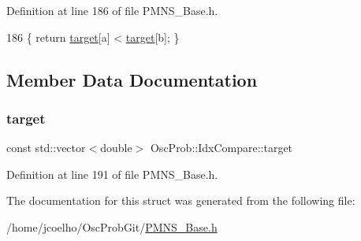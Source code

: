 Definition at line 186 of file P\+M\+N\+S\+\_\+\+Base.\+h.


\begin{DoxyCode}
186 \{ \textcolor{keywordflow}{return} \hyperlink{structOscProb_1_1IdxCompare_ab3258085f0afeb64bf472413bfed43ac}{target}[a] < \hyperlink{structOscProb_1_1IdxCompare_ab3258085f0afeb64bf472413bfed43ac}{target}[b]; \}
\end{DoxyCode}


\subsection{Member Data Documentation}
\mbox{\label{structOscProb_1_1IdxCompare_ab3258085f0afeb64bf472413bfed43ac}} 
\subsubsection{\texorpdfstring{target}{target}}
{\footnotesize\ttfamily const std\+::vector$<$double$>$ Osc\+Prob\+::\+Idx\+Compare\+::target\hspace{0.3cm}{\ttfamily [private]}}



Definition at line 191 of file P\+M\+N\+S\+\_\+\+Base.\+h.



The documentation for this struct was generated from the following file\+:\begin{DoxyCompactItemize}
\item 
/home/jcoelho/\+Osc\+Prob\+Git/\hyperlink{PMNS__Base_8h}{P\+M\+N\+S\+\_\+\+Base.\+h}\end{DoxyCompactItemize}

